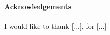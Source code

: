 \newpage
\begin{doublespacing}
{\Large\textbf{Acknowledgements}}\\ \\

I would like to thank [...], for [...]

\end{doublespacing}